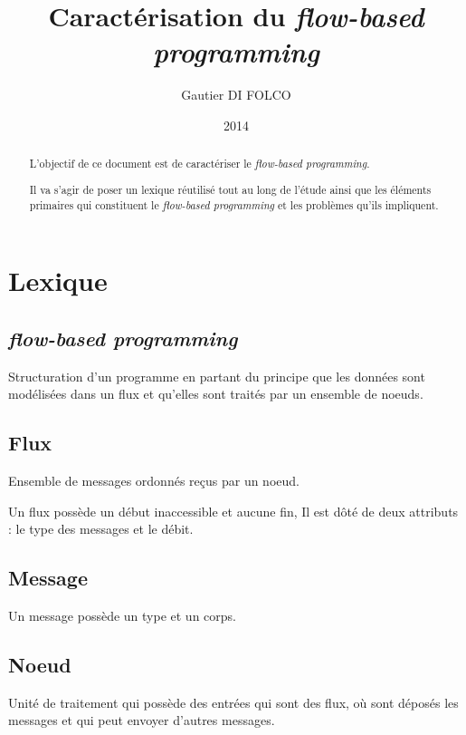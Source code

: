 \documentclass{article}
\title{Caractérisation du \emph{flow-based programming}}
\author{Gautier DI FOLCO}
\date{2014}
\begin{document}
\maketitle
\tableofcontents

\begin{abstract}
L'objectif de ce document est de caractériser le \emph{flow-based programming}.

Il va s'agir de poser un lexique réutilisé tout au long de l'étude ainsi que les
éléments primaires qui constituent le \emph{flow-based programming} et les problèmes
qu'ils impliquent.
\end{abstract}

\section{Lexique}
\subsection{\emph{flow-based programming}}
Structuration d'un programme en partant du principe que les données sont modélisées
dans un flux et qu'elles sont traités par un ensemble de noeuds.

\subsection{Flux}
Ensemble de messages ordonnés reçus par un noeud.

Un flux possède un début inaccessible et aucune fin, Il est dôté de deux attributs :
le type des messages et le débit.

\subsection{Message}
Un message possède un type et un corps.

\subsection{Noeud}
Unité de traitement qui possède des entrées qui sont des flux, où sont déposés
les messages et qui peut envoyer d'autres messages.
\end{document}
